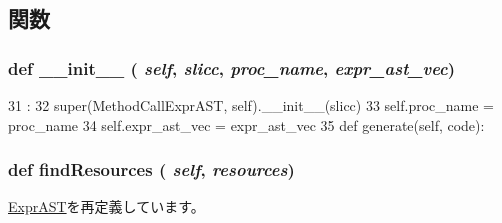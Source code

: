 \subsection{関数}
\hypertarget{classslicc_1_1ast_1_1MethodCallExprAST_1_1MethodCallExprAST_ac775ee34451fdfa742b318538164070e}{
\subsubsection[{\_\-\_\-init\_\-\_\-}]{\setlength{\rightskip}{0pt plus 5cm}def \_\-\_\-init\_\-\_\- ( {\em self}, \/   {\em slicc}, \/   {\em proc\_\-name}, \/   {\em expr\_\-ast\_\-vec})}}
\label{classslicc_1_1ast_1_1MethodCallExprAST_1_1MethodCallExprAST_ac775ee34451fdfa742b318538164070e}



\begin{DoxyCode}
31                                                       :
32         super(MethodCallExprAST, self).__init__(slicc)
33         self.proc_name = proc_name
34         self.expr_ast_vec = expr_ast_vec
35 
    def generate(self, code):
\end{DoxyCode}
\hypertarget{classslicc_1_1ast_1_1MethodCallExprAST_1_1MethodCallExprAST_abd195c795639b490ba2de4c1246105f1}{
\subsubsection[{findResources}]{\setlength{\rightskip}{0pt plus 5cm}def findResources ( {\em self}, \/   {\em resources})}}
\label{classslicc_1_1ast_1_1MethodCallExprAST_1_1MethodCallExprAST_abd195c795639b490ba2de4c1246105f1}


\hyperlink{classslicc_1_1ast_1_1ExprAST_1_1ExprAST_abd195c795639b490ba2de4c1246105f1}{ExprAST}を再定義しています。


